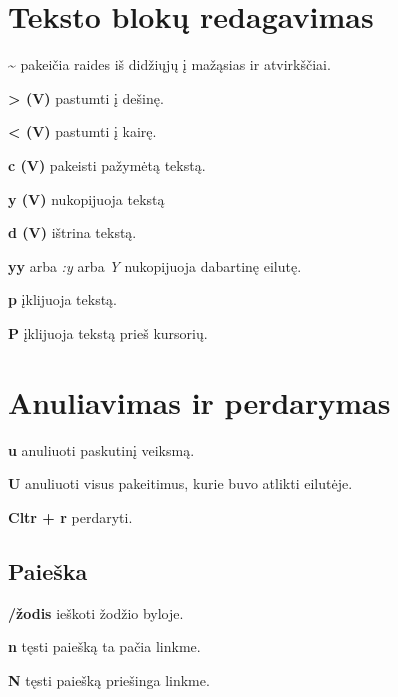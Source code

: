 \documentclass[11pt,a4paper]{article}
\begin{document}
  \section{Teksto blokų redagavimas}

  \begin{multicols}{2}

    \textbf{\~} pakeičia raides iš didžiųjų į mažąsias ir atvirkščiai.

    \textbf{> (V)} pastumti į dešinę.

    \textbf{< (V)} pastumti į kairę.

    \textbf{c (V)} pakeisti pažymėtą tekstą.

    \textbf{y (V)} nukopijuoja tekstą

    \textbf{d (V)} ištrina tekstą.

    \textbf{yy} arba \textsl{:y} arba \textsl{Y} nukopijuoja dabartinę
    eilutę.

    \textbf{p} įklijuoja tekstą.

    \textbf{P} įklijuoja tekstą prieš kursorių.

  \end{multicols}

  \section{Anuliavimas ir perdarymas}

  \begin{multicols}{2}

    \textbf{u} anuliuoti paskutinį veiksmą.

    \textbf{U} anuliuoti visus pakeitimus, kurie buvo atlikti
    eilutėje.

    \textbf{Cltr + r} perdaryti.

  \end{multicols}

  \begin{multicols}{2}

    \section{Paieška}

    \textbf{/žodis} ieškoti žodžio byloje.

    \textbf{n} tęsti paiešką ta pačia linkme.

    \textbf{N} tęsti paiešką priešinga linkme.

  \end{multicols}
\end{document}
